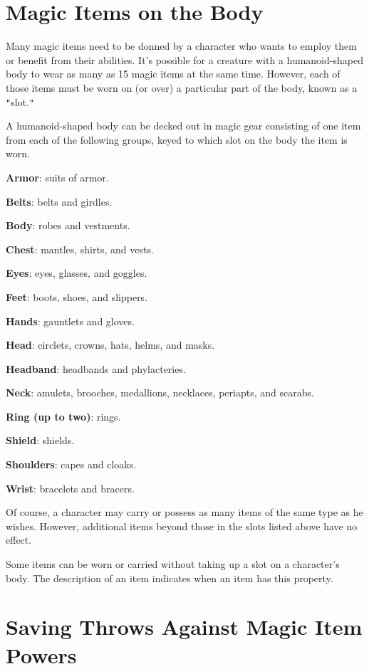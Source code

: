 \section{Magic Items on the Body}

				
Many magic items need to be donned by a character who wants to employ them or benefit from their abilities. It's possible for a creature with a humanoid-shaped body to wear as many as 15 magic items at the same time. However, each of those items must be worn on (or over) a particular part of the body, known as a \texttt{{}"{}}slot.\texttt{{}"{}}
				
A humanoid-shaped body can be decked out in magic gear consisting of one item from each of the following groups, keyed to which slot on the body the item is worn.
				
\textbf{Armor}: suits of armor.
				
\textbf{Belts}: belts and girdles.
				
\textbf{Body}: robes and vestments.
				
\textbf{Chest}: mantles, shirts, and vests.
				
\textbf{Eyes}: eyes, glasses, and goggles.
				
\textbf{Feet}: boots, shoes, and slippers.
				
\textbf{Hands}: gauntlets and gloves.
				
\textbf{Head}: circlets, crowns, hats, helms, and masks.
				
\textbf{Headband}: headbands and phylacteries.
				
\textbf{Neck}: amulets, brooches, medallions, necklaces, periapts, and scarabs.
				
\textbf{Ring (up to two)}: rings.
				
\textbf{Shield}: shields.
				
\textbf{Shoulders}: capes and cloaks.
				
\textbf{Wrist}: bracelets and bracers. 
				
Of course, a character may carry or possess as many items of the same type as he wishes. However, additional items beyond those in the slots listed above have no effect. 
				
Some items can be worn or carried without taking up a slot on a character's body. The description of an item indicates when an item has this property.
				
\section{Saving Throws Against Magic Item Powers}

